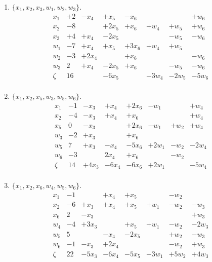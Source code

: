 \documentclass[11pt]{article}
\begin{document}
\begin{enumerate}
\item $\{ x_1, x_2, x_3, w_1, w_2, w_3 \}$.
  \[\begin{array}{r|ccccccccccccc}
  x_1 & +2 &  -x_4 & +x_5 & -x_6 & & & +w_{6}\\
  x_2 & -8 &  & +2x_5 & +x_6 & +w_{4} & +w_{5} & +w_{6} \\
  x_3 & +4 &  +x_4 & -2x_5 & & & -w_5 & -w_6 \\
  w_1 & -7 &  +x_4 & +x_5 & +3x_6 & +w_4 & +w_5 & & \\
  w_2 & -3 &  +2x_4 & & +x_6 & & & -w_6 \\
  w_3 & 2 &  +x_4 & -2x_5 & +x_6 & & -w_5 & -w_6 \\ 
  \hline
  \zeta & 16 & & -6x_5 & & -3w_4 & -2w_5 & -5w_6 \\
  \end{array}\]
\item $\{ x_1, x_2, x_5, w_3, w_5, w_6 \}$.
  \[\begin{array}{r|ccccccccccccc}
  x_1 & -1 & -x_3 & +x_4 & +2x_6 & -w_1 & & +w_4 \\ 
  x_2 & -4 & -x_3 & +x_4 & +x_6 & & & +w_4 \\
  x_5 & 0 & -x_3 & & +2x_6 & -w_1 & +w_2 & +w_4 \\
  w_3 & -2 & +x_3 & & +x_6 & & & & \\
  w_5 & 7 & +x_3 & -x_4 & -5x_6 & +2w_1 & -w_2 & -2w_4 \\
  w_6 & -3 & & 2x_4 & +x_6 & & -w_2 & & \\
  \hline
  \zeta & 14 & +4x_3 & -6x_4 & -6x_6 & +2w_1 & & -5w_4 \\
  \end{array}\]
\item $\{x_1, x_2, x_6, w_{4}, w_5, w_6 \}$.
  \[\begin{array}{r|ccccccccccccc}
  x_1 & -1 & & +x_4 & +x_5 & & -w_2 & & \\
  x_2 & -6 & +x_3 & +x_4 & +x_5 & +w_1 & -w_2 & -w_3 \\
  x_6 & 2 & -x_3 & & & & & +w_3 \\
  w_4 & -4 & +3x_3 & & +x_5 & +w_1 & -w_2 & -2w_3 \\
  w_5 & 5 & & -x_4 & -2x_5 & & +w_2 & -w_3 \\
  w_6 & -1 & -x_3 & +2x_4 & & & -w_2 & +w_3 \\
  \hline
  \zeta & 22 & -5x_3 & -6x_4 & -5x_5 & -3w_1 & +5w_2 & +4w_3 \\
  \end{array}\]
\end{enumerate}
\end{document}
